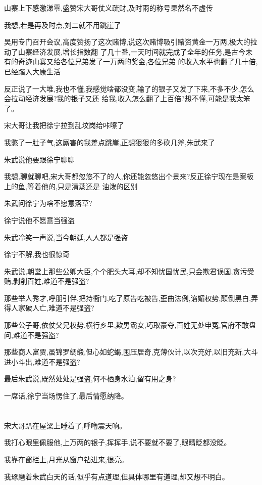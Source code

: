 ﻿\documentclass[12pt]{article}
\begin{document}
山寨上下感激涕零,盛赞宋大哥仗义疏财,及时雨的称号果然名不虚传

我想,若是再及时点,刘二就不用跳崖了

吴用专门召开会议,高度赞扬了这次赌博,说这次赌博吸引赌资黄金一万两,极大的拉动了山寨经济发展,增长指数翻
了几十番,一天时间就完成了全年的任务,是古今未有的奇迹\dldots 山寨又给各位兄弟发了一万两的奖金,各位兄弟
的收入水平也翻了几十倍,已经踏入大康生活\dldots

反正说了一大堆,我也不懂,我感觉啥都没变,输了的银子又发了下来,不多不少,怎么会拉动经济发展?我的银子又还
给我,收入怎么翻了上百倍?想不懂,可能是我太笨了。

宋大哥让我把徐宁拉到乱坟岗给咔嚓了

我憋了一肚子气,这厮害的我差点跳崖,正想狠狠的多砍几斧,朱武来了

朱武说他要跟徐宁聊聊

我想,聊就聊吧,宋大哥都忽悠不了的人,你还能忽悠出个景来?反正徐宁现在是案板上的鱼,等着他的,只是清蒸还是
油泼的区别

朱武问徐宁为啥不愿意落草?

徐宁说他不愿意当强盗

朱武冷笑一声说,当今朝廷,人人都是强盗

徐宁不解,我也很惊奇

朱武说,朝堂上那些公卿大臣,个个肥头大耳,却不知忧国忧民,只会欺君误国,贪污受贿,剥削百姓,难道不是强盗?

那些举人秀才,呼朋引伴,把持衙门,吃了原告吃被告,歪曲法例,谄媚权势,颠倒黑白,弄得人家破人亡,难道不是强盗?

那些公子哥,依仗父兄权势,横行乡里,欺男霸女,巧取豪夺,百姓无处申冤,官府不敢盘问,难道不是强盗?

那些商人富贾,虽锦罗绸缎,但心如蛇蝎,囤压居奇,克薄伙计,以次充好,以旧充新,大斗进小斗出,难道不是强盗?

最后朱武说,既然处处是强盗,何不栖身水泊,留有用之身?

一席话,徐宁当场愣住了,最后情愿纳降。

\section{}

宋大哥趴在屋梁上睡着了,呼噜震天响。

我打心眼里佩服他,上万两的银子,挥挥手,说不要就不要了,眼睛眨都没眨。

我靠在窗栏上,月光从窗户钻进来,很亮。

我琢磨着朱武白天的话,似乎有点道理,但具体哪里有道理,却又想不明白。
\end{document}
